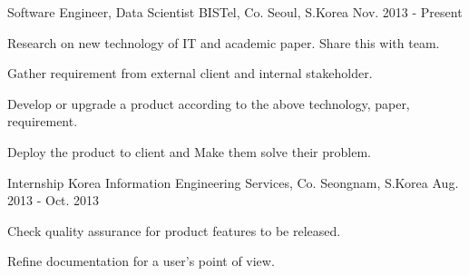 

\begin{cventries}

  \cventry
    {Software Engineer, Data Scientist} %
    {BISTel, Co.} %
    {Seoul, S.Korea} %
    {Nov. 2013 - Present} %
    {
      \begin{cvitems} %
        \item {Research on new technology of IT and academic paper. Share this with team.}
        \item {Gather requirement from external client and internal stakeholder.}
        \item {Develop or upgrade a product according to the above technology, paper, requirement.}
        \item {Deploy the product to client and Make them solve their problem.}
      \end{cvitems}
    }

  \cventry
    {Internship} %
    {Korea Information Engineering Services, Co.} %
    {Seongnam, S.Korea} %
    {Aug. 2013 - Oct. 2013} %
    {
      \begin{cvitems} %
        \item {Check quality assurance for product features to be released.}
        \item {Refine documentation for a user's point of view.}
      \end{cvitems}
    }

\end{cventries}
